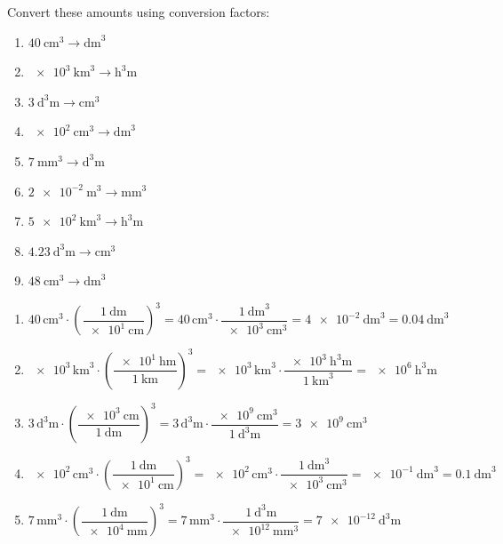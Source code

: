 \begin{exercise}
    Convert these amounts using conversion factors:
    \begin{enumerate}[label=\letraminuscula]
        \item \(\qty{40}{\cubic\cm} \to \unit{\cubic\dm}\)
        \item \(\qty{e3}{\cubic\km} \to \unit{\cubic\hecto\m}\)
        \item \(\qty{3}{\cubic\deca\m} \to \unit{\cubic\cm}\)
        \item \(\qty{e2}{\cubic\cm} \to \unit{\cubic\dm}\)
        \item \(\qty{7}{\cubic\mm} \to \unit{\cubic\deca\m}\)
        \item \(\qty{2e-2}{\cubic\m} \to \unit{\cubic\mm}\)
        \item \(\qty{5e2}{\cubic\km} \to \unit{\cubic\hecto\m}\)
        \item \(\qty{4.23}{\cubic\deca\m} \to \unit{\cubic\cm}\)
        \item \(\qty{48}{\cubic\cm} \to \unit{\cubic\dm}\)
    \end{enumerate}
    \begin{solu}
        \begin{enumerate}[label=\alph*)]
            \item \(\num{40}\,\unit{\cubic\cm} \cdot \left(\dfrac{\qty{1}{\dm}}{\qty{e1}{\cm}}\right)^{3} = \num{40}\,\unit{\cubic\cm} \cdot \dfrac{\qty{1}{\cubic\dm}}{\qty{e3}{\cubic\cm}} = \qty{4e-2}{\cubic\dm} = \qty{0.04}{\cubic\dm}\)
            \item \(\num{e3}\,\unit{\cubic\km} \cdot \left(\dfrac{\qty{e1}{\hecto\m}}{\qty{1}{\km}}\right)^{3} = \num{e3}\,\unit{\cubic\km} \cdot \dfrac{\qty{e3}{\cubic\hecto\m}}{\qty{1}{\cubic\km}} = \qty{e6}{\cubic\hecto\m}\)
            \item \(\num{3}\,\unit{\cubic\deca\m} \cdot \left(\dfrac{\qty{e3}{\cm}}{\qty{1}{\deca\m}}\right)^{3} = \num{3}\,\unit{\cubic\deca\m} \cdot \dfrac{\qty{e9}{\cubic\cm}}{\qty{1}{\cubic\deca\m}} = \qty{3e9}{\cubic\cm}\)
            \item \(\num{e2}\,\unit{\cubic\cm} \cdot \left(\dfrac{\qty{1}{\dm}}{\qty{e1}{\cm}}\right)^{3} = \num{e2}\,\unit{\cubic\cm} \cdot \dfrac{\qty{1}{\cubic\dm}}{\qty{e3}{\cubic\cm}} = \qty{e-1}{\cubic\dm} = \qty{0.1}{\cubic\dm}\)
            \item \(\num{7}\,\unit{\cubic\mm} \cdot \left(\dfrac{\qty{1}{\deca\m}}{\qty{e4}{\mm}}\right)^{3} = \num{7}\,\unit{\cubic\mm} \cdot \dfrac{\qty{1}{\cubic\deca\m}}{\qty{e12}{\cubic\mm}} = \qty{7e-12}{\cubic\deca\m}\)

\end{enumerate}
\end{solu}
\end{exercise}
